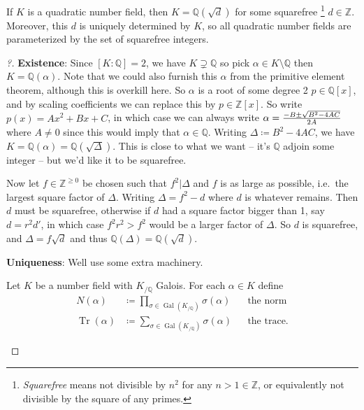 \begin{proposition}[?]

If \(K\) is a quadratic number field, then
\(K = {\mathbb{Q}}(\sqrt{d})\) for some squarefree \footnote{\emph{Squarefree}
  means not divisible by \(n^2\) for any \(n > 1\in {\mathbb{Z}}\), or
  equivalently not divisible by the square of any primes.}
\(d\in {\mathbb{Z}}\). Moreover, this \(d\) is uniquely determined by
\(K\), so all quadratic number fields are parameterized by the set of
squarefree integers.

\end{proposition}

\begin{proof}[?]

\textbf{Existence}: Since \([K: {\mathbb{Q}}] = 2\), we have
\(K\supsetneq {\mathbb{Q}}\) so pick
\(\alpha\in K\setminus{\mathbb{Q}}\) then \(K = {\mathbb{Q}}(\alpha)\).
Note that we could also furnish this \(\alpha\) from the primitive
element theorem, although this is overkill here. So \(\alpha\) is a root
of some degree 2 \(p\in {\mathbb{Q}}[x]\), and by scaling coefficients
we can replace this by \(p\in {\mathbb{Z}}[x]\). So write
\(p(x) = Ax^2 + Bx + C\), in which case we can always write
\(\alpha = {-B \pm \sqrt{B^2 - 4AC} \over 2A}\) where \(A\neq 0\) since
this would imply that \(\alpha\in{\mathbb{Q}}\). Writing
\(\Delta\coloneqq B^2 - 4AC\), we have
\(K = {\mathbb{Q}}(\alpha) = {\mathbb{Q}}(\sqrt{\Delta})\). This is
close to what we want -- it's \({\mathbb{Q}}\) adjoin some integer --
but we'd like it to be squarefree.

Now let \(f\in {\mathbb{Z}}^{\geq 0}\) be chosen such that
\(f^2 \mathrel{\Big|}\Delta\) and \(f\) is as large as possible,
i.e.~the largest square factor of \(\Delta\). Writing
\(\Delta = f^2 - d\) where \(d\) is whatever remains. Then \(d\) must be
squarefree, otherwise if \(d\) had a square factor bigger than 1, say
\(d = r^2 d'\), in which case \(f^2 r^2 > f^2\) would be a larger factor
of \(\Delta\). So \(d\) is squarefree, and \(\Delta = f \sqrt d\) and
thus \({\mathbb{Q}}(\Delta) = {\mathbb{Q}}(\sqrt{d})\).

\textbf{Uniqueness}: Well use some extra machinery.

\begin{definition}

Let \(K\) be a number field with \(K_{/{\mathbb{Q}}}\) Galois. For each
\(\alpha\in K\) define
\begin{align*}
N(\alpha) &\coloneqq\prod_{\sigma\in \operatorname{Gal}(K_{/{\mathbb{Q}}})} \sigma(\alpha) && \text{the norm} \\
\operatorname{Tr}(\alpha) &\coloneqq\sum_{\sigma\in \operatorname{Gal}(K_{/{\mathbb{Q}}})} \sigma(\alpha) && \text{the trace}
.\end{align*}


\end{definition}
\end{proof}
